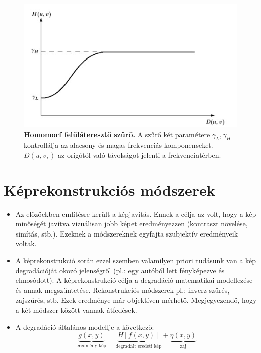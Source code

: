 \documentclass[12pt]{article}
\theoremstyle{plain}
\begin{document}
\begin{itemize}
\begin{figure}[H]
    \begin{center}
    \includegraphics[width=0.75\linewidth]{media/gauss.png}
    \caption{\textbf{Homomorf felüláteresztő szűrő.} A szűrő két paramétere $\gamma_L,\gamma_H$ kontrollálja az alacsony és magas frekvenciás komponenseket. $D(u,v,) $ az origótól való távolságot jelenti a frekvenciatérben.} 
    \label{fig:gauss}
    \end{center}
\end{figure}


\end{itemize}{}

\section{Képrekonstrukciós módszerek}

\begin{itemize}
    \item Az előzőekben említésre került a képjavítás. Ennek a célja az volt, hogy a kép minőségét javítva vizuálisan jobb képet eredményezzen (kontraszt növelése, simítás, stb.). Ezeknek a módszereknek egyfajta szubjektív eredményeik voltak.
    \item A képrekonstrukció során ezzel szemben valamilyen priori tudásunk van a kép degradációját okozó jelenségről (pl.: egy autóból lett fényképezve és elmosódott). A képrekonstrukció célja a degradáció matematikai modellezése és annak megszüntetése. Rekonstrukciós módszerek pl.: inverz szűrés, zajszűrés, stb. Ezek eredménye már objektíven mérhető. Megjegyezendő, hogy a két módszer között vannak átfedések.
    \item A degradáció általános modellje a következő:
    $$\underbrace{g(x,y)}_{\text{eredmény kép}} = \underbrace{H[f(x,y)]}_{\text{degradált eredeti kép}} + \underbrace{\eta(x,y)}_{\text{zaj}}$$
\end{itemize}{}
\end{document}
